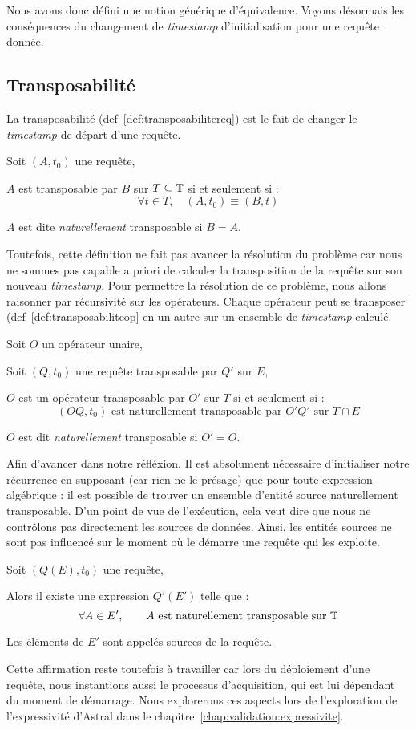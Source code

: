 Nous avons donc défini une notion générique d'équivalence. Voyons désormais les conséquences du changement de \textit{timestamp} d'initialisation pour une requête donnée.
\subsection{Transposabilité}
La transposabilité (def~\ref{def:transposabilitereq}) est le fait de changer le \textit{timestamp} de départ d'une requête.
\begin{defi}\label{def:transposabilitereq}
    Soit $(A,t_0)$ une requête,

    $A$ est transposable par $B$ sur $T\subseteq \mathbb{T}$ si et seulement si : $$\forall t\in T, \quad (A,t_0) \equiv (B,t)$$

    $A$ est dite \textit{naturellement} transposable si $B=A$.
\end{defi}
Toutefois, cette définition ne fait pas avancer la résolution du problème car nous ne sommes pas capable a priori de calculer la transposition de la requête sur son nouveau \textit{timestamp}. Pour permettre la résolution de ce problème, nous allons raisonner par récursivité sur les opérateurs. Chaque opérateur peut se transposer (def~\ref{def:transposabiliteop} en un autre sur un ensemble de \textit{timestamp} calculé.
\begin{defi}\label{def:transposabiliteop}
    Soit $O$ un opérateur unaire,

    Soit $(Q,t_0)$ une requête transposable par $Q'$ sur $E$,

    $O$ est un opérateur transposable par $O'$ sur $T$ si et seulement si : $$(OQ,t_0) \textrm{ est naturellement transposable par } O'Q' \textrm{ sur } T\cap E$$

    $O$ est dit \textit{naturellement} transposable si $O'=O$.
\end{defi}

Afin d'avancer dans notre réfléxion. Il est absolument nécessaire d'initialiser notre récurrence en supposant (car rien ne le présage) que pour toute expression algébrique : il est possible de trouver un ensemble d'entité source naturellement transposable. D'un point de vue de l'exécution, cela veut dire que nous ne contrôlons pas directement les sources de données. Ainsi, les entités sources ne sont pas influencé sur le moment où le démarre une requête qui les exploite.
\begin{hyp}\label{hyp:transposabilite}
    Soit $(Q(E),t_0)$ une requête,

    Alors il existe une expression $Q'(E')$ telle que : $$\forall A\in E', \qquad A \textrm{ est naturellement transposable sur } \mathbb{T}$$
    
    Les éléments de $E'$ sont appelés sources de la requête.
\end{hyp}
Cette affirmation reste toutefois à travailler car lors du déploiement d'une requête, nous instantions aussi le processus d'acquisition, qui est lui dépendant du moment de démarrage. Nous explorerons ces aspects lors de l'exploration de l'expressivité d'Astral dans le chapitre~\ref{chap:validation:expressivite}.

